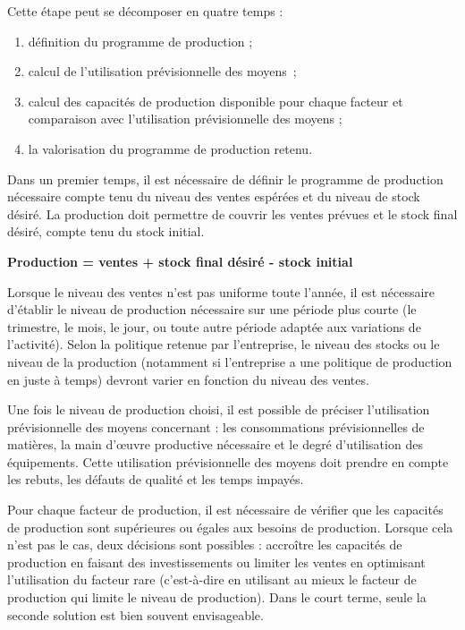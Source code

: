 \documentclass[oneside]{kaobook}
\begin{document}
Cette étape peut se décomposer en quatre temps :
\begin{enumerate}
\item définition du programme de production ;
\item calcul de l'utilisation prévisionnelle des moyens ;
\item calcul des capacités de production disponible pour chaque facteur et comparaison avec l'utilisation prévisionnelle des moyens ;
\item la valorisation du programme de production retenu.
\end{enumerate}

Dans un premier temps, il est nécessaire de définir le programme de production nécessaire compte tenu du niveau des ventes espérées et du niveau de stock désiré. La production doit permettre de couvrir les ventes prévues et le stock final désiré, compte tenu du stock initial.

\begin{center}
\textbf{Production = ventes + stock final désiré - stock initial}
\end{center}

Lorsque le niveau des ventes n'est pas uniforme toute l'année, il est nécessaire d'établir le niveau de production nécessaire sur une période plus courte (le trimestre, le mois, le jour, ou toute autre période adaptée aux variations de l'activité). Selon la politique retenue par l'entreprise, le niveau des stocks ou le niveau de la production (notamment si l'entreprise a une politique de production en juste à temps) devront varier en fonction du niveau des ventes.

Une fois le niveau de production choisi, il est possible de préciser l'utilisation prévisionnelle des moyens concernant : les consommations prévisionnelles de matières, la main d'œuvre productive nécessaire et le degré d'utilisation des équipements. Cette utilisation prévisionnelle des moyens doit prendre en compte les rebuts, les défauts de qualité et les temps impayés.

Pour chaque facteur de production, il est nécessaire de vérifier que les capacités de production sont supérieures ou égales aux besoins de production. Lorsque cela n'est pas le cas, deux décisions sont possibles : accroître les capacités de production en faisant des investissements ou limiter les ventes en optimisant l'utilisation du facteur rare (c'est-à-dire en utilisant au mieux le facteur de production qui limite le niveau de production). Dans le court terme, seule la seconde solution est bien souvent envisageable.
\end{document}
